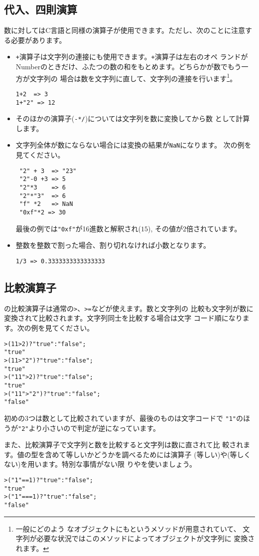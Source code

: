 \subsection{代入、四則演算}
数に対してはC言語と同様の演算子が使用できます。ただし、次のことに注意す
る必要があります。
\begin{itemize}
 \item \verb-+-演算子は文字列の連接にも使用できます。\verb-+-演算子は左右のオペ
ランドがNumberのときだけ、ふたつの数の和をもとめます。どちらかが数でもう一方が文字列の
場合は数を文字列に直して、文字列の連接を行います\footnote{一般にどのよう
			 なオブジェクトにもというメソッドが用意されていて、
			 文字列が必要な状況ではこのメソッドによってオブジェクトが文字列に
			 変換されます。}。
\begin{verbatim}
1+2  => 3
1+"2" => 12
\end{verbatim}
 \item そのほかの演算子(\verb+-*/+)については文字列を数に変換してから数
       として計算します。
 \item 文字列全体が数にならない場合には変換の結果が\verb+NaN+になります。
			 次の例を見てください。
\begin{verbatim}
 "2" + 3  => "23"
 "2"-0 +3 => 5
 "2"*3    => 6
 "2"*"3"  => 6
 "f" *2   => NaN
 "0xf"*2 => 30
\end{verbatim}
			 最後の例では\verb+"0xf"+が16進数と解釈され($15$),
			 その値が$2$倍されています。
 \item 整数を整数で割った場合、割り切れなければ小数となります。
\begin{verbatim}
1/3 => 0.3333333333333333
\end{verbatim}
\end{itemize}
\subsection{比較演算子}
\JS の比較演算子は通常の\verb+>+、\verb+>=+などが使えます。数と文字列の
比較も文字列が数に変換されて比較されます。文字列同士を比較する場合は文字
コード順になります。次の例を見てください。
\begin{verbatim}
>(11>2)?"true":"false";
"true"
>(11>"2")?"true":"false";
"true"
>("11">2)?"true":"false";
"true"
>("11">"2")?"true":"false";
"false"
\end{verbatim}
初めの3つは数として比較されていますが、最後のものは文字コードで
\verb+"1"+のほうが\verb+"2"+より小さいので判定が逆になっています。

また、比較演算子\ElmJ{==}で文字列と数を比較すると文字列は数に直されて比
較されます。値の型を含めて等しいかどうかを調べるためには演算子
\ElmJ{===}(等しい)や\ElmJ{!==}(等しくない)を用います。特別な事情がない限
り\ElmJ{===}や\ElmJ{!==}を使いましょう\cite[127ページ]{Crockford}。
\begin{verbatim}
>("1"==1)?"true":"false";
"true"
>("1"===1)?"true":"false";
"false"
\end{verbatim}
